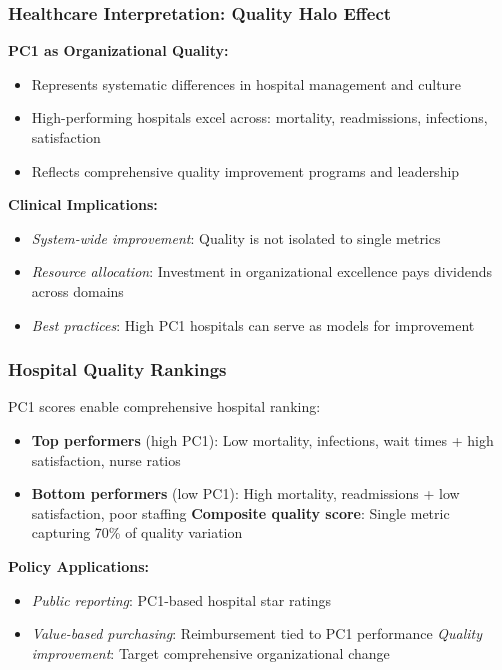 \documentclass[aspectratio=169]{beamer}
\begin{document}
\begin{frame}
    \frametitle{Healthcare Interpretation: Quality Halo Effect}
    \textbf{PC1 as Organizational Quality:}
    \begin{itemize}
        \item Represents systematic differences in hospital management and culture \pause
        \item High-performing hospitals excel across: mortality, readmissions, infections, satisfaction \pause
        \item Reflects comprehensive quality improvement programs and leadership \pause
    \end{itemize}
    \vspace{12pt}
    \textbf{Clinical Implications:}
    \begin{itemize}
        \item \textit{System-wide improvement}: Quality is not isolated to single metrics \pause
        \item \textit{Resource allocation}: Investment in organizational excellence pays dividends across domains \pause
        \item \textit{Best practices}: High PC1 hospitals can serve as models for improvement \pause
    \end{itemize}
\end{frame}

\begin{frame}
    \frametitle{Hospital Quality Rankings}
    PC1 scores enable comprehensive hospital ranking:
    \begin{itemize}
        \item \textbf{Top performers} (high PC1): Low mortality, infections, wait times + high satisfaction, nurse ratios \pause
        \item \textbf{Bottom performers} (low PC1): High mortality, readmissions + low satisfaction, poor staffing \pause
        \textbf{Composite quality score}: Single metric capturing 70\% of quality variation \pause
    \end{itemize}
    \vspace{12pt}
    \textbf{Policy Applications:}
    \begin{itemize}
        \item \textit{Public reporting}: PC1-based hospital star ratings \pause
        \item \textit{Value-based purchasing}: Reimbursement tied to PC1 performance \pause
        \textit{Quality improvement}: Target comprehensive organizational change \pause
    \end{itemize}
\end{frame}
\end{document}
